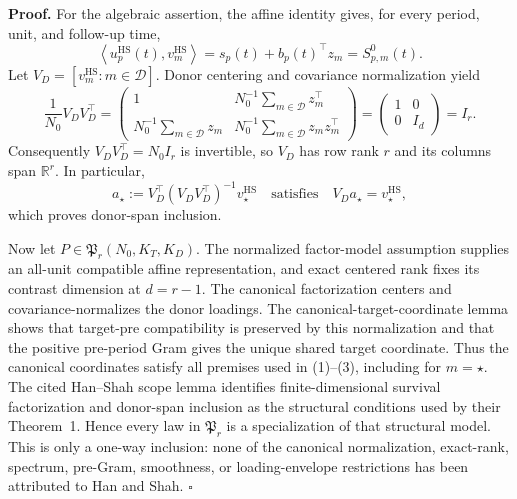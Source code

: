 \textbf{Proof.}
For the algebraic assertion, the affine identity gives, for every period, unit, and follow-up time,
\[
 \left\langle u_p^{\mathrm{HS}}(t),v_m^{\mathrm{HS}}\right\rangle
 =s_p(t)+b_p(t)^\top z_m
 =S^0_{p,m}(t).                                           \tag{1}
\]
Let \(V_D=[v_m^{\mathrm{HS}}:m\in\mathcal D]\).  Donor centering and covariance normalization yield
\[
 \frac1{N_0}V_DV_D^\top
 =\begin{pmatrix}
  1&N_0^{-1}\sum_{m\in\mathcal D}z_m^\top\\
  N_0^{-1}\sum_{m\in\mathcal D}z_m&
  N_0^{-1}\sum_{m\in\mathcal D}z_mz_m^\top
 \end{pmatrix}
 =\begin{pmatrix}1&0\\0&I_d\end{pmatrix}
 =I_r.                                                     \tag{2}
\]
Consequently \(V_DV_D^\top=N_0I_r\) is invertible, so \(V_D\) has row rank \(r\) and its columns span \(\mathbb R^r\).  In particular,
\[
 a_\star:=V_D^\top(V_DV_D^\top)^{-1}v_\star^{\mathrm{HS}}
 \quad\text{satisfies}\quad
 V_Da_\star=v_\star^{\mathrm{HS}},                       \tag{3}
\]
which proves donor-span inclusion.

Now let \(P\in\mathfrak P_r(N_0,K_T,K_D)\).  The normalized factor-model assumption supplies an all-unit compatible affine representation, and exact centered rank fixes its contrast dimension at \(d=r-1\).  The canonical factorization centers and covariance-normalizes the donor loadings.  The canonical-target-coordinate lemma shows that target-pre compatibility is preserved by this normalization and that the positive pre-period Gram gives the unique shared target coordinate.  Thus the canonical coordinates satisfy all premises used in (1)--(3), including for \(m=\star\).  The cited Han--Shah scope lemma identifies finite-dimensional survival factorization and donor-span inclusion as the structural conditions used by their Theorem~1.  Hence every law in \(\mathfrak P_r\) is a specialization of that structural model.  This is only a one-way inclusion: none of the canonical normalization, exact-rank, spectrum, pre-Gram, smoothness, or loading-envelope restrictions has been attributed to Han and Shah. \(\square\)